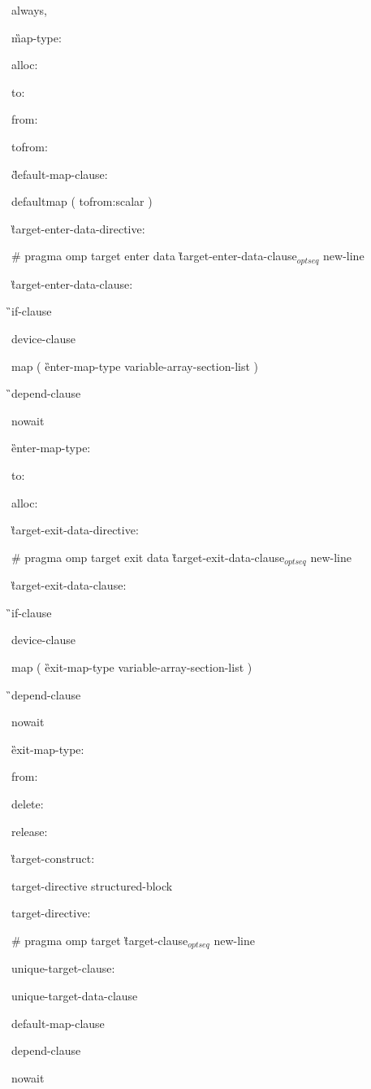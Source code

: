 {\C\I always,

\G map-type:

\C\I alloc:

\I to:

\I from:

\I tofrom:

\G default-map-clause:

\C\I defaultmap ( tofrom:scalar ) 

\G target-enter-data-directive:

\C\I \# pragma omp target enter data \G target-enter-data-clause$_{optseq}$ new-line

\G target-enter-data-clause:

\G\I if-clause

\I device-clause

\C\I map ( \G enter-map-type variable-array-section-list \C )

\G\I depend-clause

\C\I nowait

\G enter-map-type:

\C\I to:

\I alloc:

\G target-exit-data-directive:

\C\I \# pragma omp target exit data \G target-exit-data-clause$_{optseq}$ new-line

\G target-exit-data-clause:

\G\I if-clause

\I device-clause

\C\I map ( \G exit-map-type variable-array-section-list \C )

\G\I depend-clause

\C\I nowait

\G exit-map-type:

\C\I from:

\I delete:

\I release:

\G target-construct:

\I target-directive structured-block

target-directive:

\C\I \# pragma omp target \G target-clause$_{optseq}$ new-line

unique-target-clause:

\I unique-target-data-clause

\I default-map-clause

\I depend-clause

\C\I nowait

}

